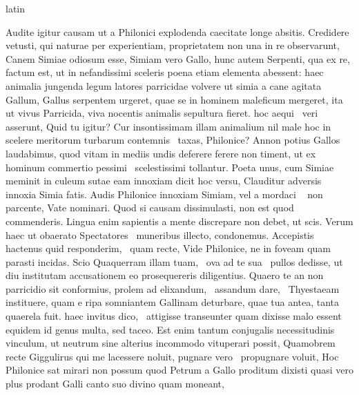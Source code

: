 \documentclass[12pt]{book}
\renewenvironment{latin}
    	{\begin{hyphenrules}{latin}}
    	{\end{hyphenrules}}
\begin{document}
\begin{pages}
\begin{latin}
\begin{Leftside}
                  Audite igitur causam ut a Philonici explodenda caecitate longe absitis. Credidere vetusti, qui naturae per experientiam, proprietatem non una in re observarunt, Canem Simiae odiosum esse, Simiam vero Gallo, 
                  hunc autem Serpenti, qua ex re, factum est, ut in nefandissimi sceleris poena  etiam elementa abessent: 
                  haec animalia jungenda legum latores parricidae volvere ut simia a cane agitata Gallum, Gallus serpentem urgeret, quae se in hominem maleficum mergeret, 
                  ita ut vivus Parricida, viva nocentis animalis sepultura fieret. hoc aequi  \ampersand\ veri  asserunt, Quid tu igitur? 
                  Cur insontissimam illam animalium nil male hoc in scelere meritorum turbarum contemnis  \ampersand\ taxas, Philonice? Annon potius Gallos laudabimus, quod vitam in mediis undis deferere  ferere non timent,
                  ut ex hominum commertio pessimi  \ampersand\ scelestissimi tollantur. Poeta unus, cum Simiae meminit in culeum sutae eam innoxiam dicit hoc versu, Clauditur adversis innoxia Simia fatis.
                  Audis Philonice innoxiam Simiam, vel a mordaci  \ampersand\  non parcente, Vate nominari. Quod si causam dissimulasti, non est quod commenderis. 
                  Lingua enim sapientis a mente discrepare non debet, ut scis. Verum haec ut obaerato Spectatores  \ampersand\ muneribus illecto, condonemus. Accepistis hactenus quid responderim, 
                   \ampersand\ quam recte, Vide Philonice, ne in foveam quam parasti incidas. Scio Quaquerram illam tuam,  \ampersand\ ova ad te sua  \ampersand\ pullos dedisse, ut diu institutam accusationem eo prosequereris diligentius.
                  Quaero te an non parricidio sit conformius, prolem ad elixandum,  \ampersand\ assandum dare,  \ampersand\ Thyestaeam  instituere,
                  quam e ripa somniantem Gallinam deturbare, quae tua antea, tanta quaerela fuit.  haec invitus dico,
                   \ampersand\ attigisse transeunter quam dixisse malo essent equidem id genus multa, sed taceo. Est enim tantum conjugalis necessitudinis vinculum, ut neutrum sine alterius incommodo vituperari possit, 
                  Quamobrem recte Giggulirus qui me lacessere noluit, pugnare vero  \ampersand\ propugnare voluit, Hoc Philonice sat mirari non possum quod Petrum a Gallo proditum dixisti quasi vero plus prodant Galli canto suo divino quam moneant, 

\end{Leftside}
\end{latin}
\end{pages}
\end{document}

